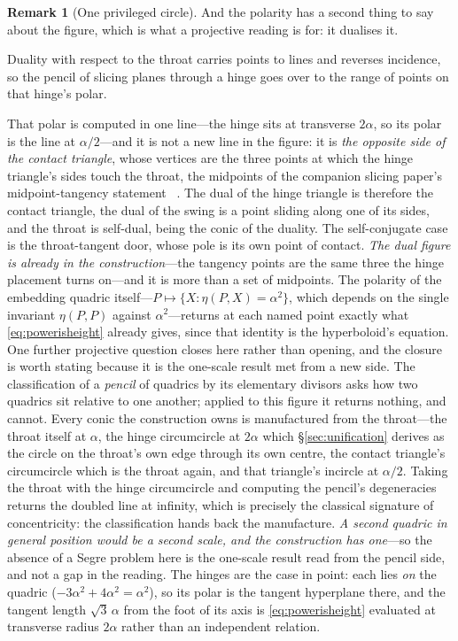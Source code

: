 \documentclass[11pt,a4paper]{article}
\theoremstyle{definition}
\newtheorem{remark}[theorem]{Remark}
\begin{document}
\begin{remark}[One privileged circle]
And the polarity has a second thing to say about the figure, which is what a projective reading is for: it dualises it. 

Duality with respect to the throat carries points to lines and reverses incidence, so the pencil of slicing planes through a hinge goes over to the range of points on that hinge's polar. 

That polar is computed in one line---the hinge sits at transverse $2\alpha$, so its polar is the line at $\alpha/2$---and it is not a new line in the figure: it is \emph{the opposite side of the contact triangle}, whose vertices are the three points at which the hinge triangle's sides touch the throat, the midpoints of the companion slicing paper's midpoint-tangency statement~\cite{JanzenSlicing}%
. The dual of the hinge triangle is therefore the contact triangle, the dual of the swing is a point sliding along one of its sides, and the throat is self-dual, being the conic of the duality. The self-conjugate case is the throat-tangent door, whose pole is its own point of contact. \emph{The dual figure is already in the construction}---the tangency points are the same three the hinge placement turns on---and it is more than a set of midpoints. The
polarity of the embedding quadric itself---$P\mapsto\{X:\eta(P,X)=\alpha^{2}\}$,
which depends on the single invariant $\eta(P,P)$ against $\alpha^{2}$---returns
at each named point exactly what \eqref{eq:powerisheight} already gives, since
that identity is the hyperboloid's equation. One further projective question closes here rather than opening, and the closure is worth stating because it is the one-scale result met from a new side. The classification of a \emph{pencil} of quadrics by its elementary divisors asks how two quadrics sit relative to one another; applied to this figure it returns nothing, and cannot. Every conic the construction owns is manufactured from the throat---the throat itself at $\alpha$, the hinge circumcircle at $2\alpha$ which \S\ref{sec:unification} derives as the circle on the throat's own edge through its own centre, the contact triangle's circumcircle which is the throat again, and that triangle's incircle at $\alpha/2$. Taking the throat with the hinge circumcircle and computing the pencil's degeneracies returns the doubled line at infinity, which is precisely the classical signature of concentricity: the classification hands back the manufacture. \emph{A second quadric in general position would be a second scale, and the construction has one}---so the absence of a Segre problem here is the one-scale result read from the pencil side, and not a gap in the reading. The hinges are the case in point:
each lies \emph{on} the quadric ($-3\alpha^{2}+4\alpha^{2}=\alpha^{2}$), so its
polar is the tangent hyperplane there, and the tangent length $\sqrt3\,\alpha$
from the foot of its axis is \eqref{eq:powerisheight} evaluated at transverse
radius $2\alpha$ rather than an independent
relation.
\end{remark}
\end{document}
